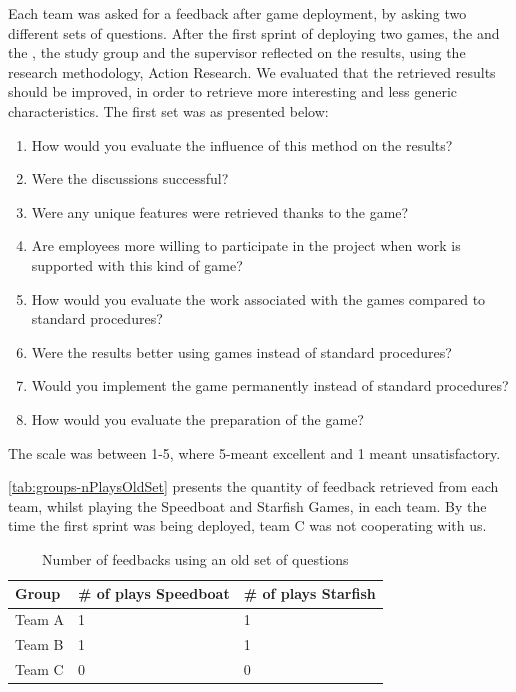 Each team was asked for a feedback after game deployment, by asking two different sets of questions. After the first sprint of deploying two games, the  and the , the study group and the supervisor  reflected on the results, using the research methodology, Action Research. We evaluated that the retrieved results should be improved, in order to retrieve more interesting and less generic characteristics. The first set was as presented below:
\begin{enumerate}
    \item How would you evaluate the influence of this method on the results?
	\item Were the discussions successful?
	\item Were any unique features were retrieved thanks to the game?
	\item Are employees more willing to participate in the project when work is supported with this kind of game?
	\item How would you evaluate the work associated with the games compared to standard procedures?
	\item Were the results better using games instead of standard procedures?	
	\item Would you implement the game permanently instead of standard procedures?
	\item How would you evaluate the preparation of the game?
\end{enumerate}
The scale was between 1-5, where 5-meant excellent and 1 meant unsatisfactory. 

\autoref{tab:groups-nPlaysOldSet} presents the quantity of feedback retrieved from each team, whilst playing the Speedboat and Starfish Games, in each team. By the time the first sprint was being deployed, team C was not cooperating with us.
\newline


\begin{table}[!htbp]
	\caption{Number of feedbacks using an old set of questions}
	\label{tab:groups-nPlaysOldSet}
	\begin{tabularx}{\textwidth}{|X|X|X|}
	\hline
		Group & \# of plays Speedboat & \# of plays Starfish \\ \hline
		Team A & 1 & 1  \\ \hline
		Team B & 1 & 1 \\ \hline
		Team C & 0 & 0 \\ \hline
	\end{tabularx}
\end{table}

